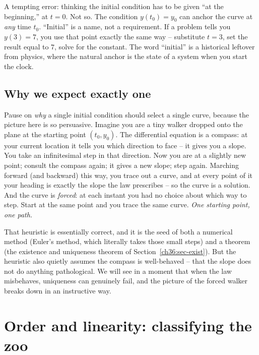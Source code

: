 \begin{trapbox}
A tempting error: thinking the initial condition has to be given ``at the beginning,'' at $t=0$. Not so. The condition $y(t_0)=y_0$ can anchor the curve at \emph{any} time $t_0$. ``Initial'' is a name, not a requirement. If a problem tells you $y(3) = 7$, you use that point exactly the same way -- substitute $t=3$, set the result equal to $7$, solve for the constant. The word ``initial'' is a historical leftover from physics, where the natural anchor is the state of a system when you start the clock.
\end{trapbox}

\subsection{Why we expect exactly one}

Pause on \emph{why} a single initial condition should select a single curve, because the picture here is so persuasive. Imagine you are a tiny walker dropped onto the plane at the starting point $(t_0, y_0)$. The differential equation is a compass: at your current location it tells you which direction to face -- it gives you a slope. You take an infinitesimal step in that direction. Now you are at a slightly new point; consult the compass again; it gives a new slope; step again. Marching forward (and backward) this way, you trace out a curve, and at every point of it your heading is exactly the slope the law prescribes -- so the curve is a solution. And the curve is \emph{forced}: at each instant you had no choice about which way to step. Start at the same point and you trace the same curve. \emph{One starting point, one path.}

That heuristic is essentially correct, and it is the seed of both a numerical method (Euler's method, which literally takes those small steps) and a theorem (the existence and uniqueness theorem of Section~\ref{ch36:sec-exist}). But the heuristic also quietly assumes the compass is well-behaved -- that the slope does not do anything pathological. We will see in a moment that when the law misbehaves, uniqueness can genuinely fail, and the picture of the forced walker breaks down in an instructive way.

\section{Order and linearity: classifying the zoo}
\label{ch36:sec-classify}

